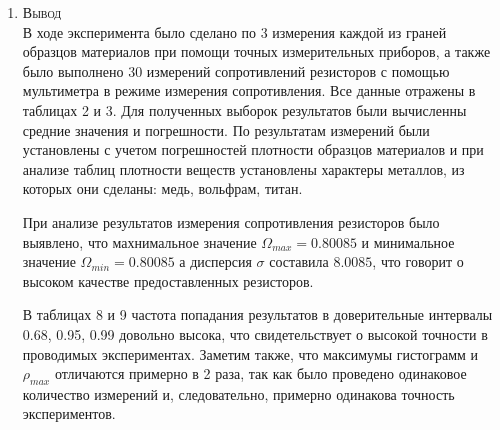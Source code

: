 \documentclass[12pt]{article}
\begin{document}
\begin{enumerate}
    \item \large\textsc{Вывод}
\\ В ходе эксперимента было сделано по 3 измерения каждой из граней образцов материалов при помощи точных измерительных приборов, а также было выполнено 30 измерений сопротивлений резисторов с помощью мультиметра в режиме измерения сопротивления. Все данные отражены в таблицах 2 и 3. Для полученных выборок результатов были вычисленны средние значения и погрешности.%
По результатам измерений были установлены с учетом погрешностей плотности образцов материалов и при анализе таблиц плотности веществ установлены характеры металлов, из которых они сделаны: медь, вольфрам, титан. \par
При анализе результатов измерения сопротивления резисторов было выявлено, что махнимальное значение $\Omega_{max}=0.80085$ и минимальное значение $\Omega_{min}=0.80085$ а дисперсия $\sigma$ составила $8.0085$, что говорит о высоком качестве предоставленных резисторов.\par
В таблицах 8 и 9 частота попадания результатов в доверительные интервалы 0.68, 0.95, 0.99 довольно высока, что свидетельствует о высокой точности в проводимых экспериментах. Заметим также, что  максимумы гистограмм и $\rho_{max}$ отличаются примерно в 2 раза, так как было проведено одинаковое количество измерений и, следовательно, примерно одинакова точность экспериментов.
    
\end{enumerate}
\end{document}

